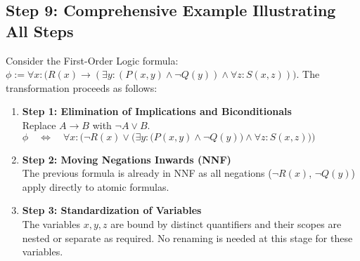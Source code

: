 \subsection{Step 9: Comprehensive Example Illustrating All Steps}
Consider the First-Order Logic formula:
$\phi := \forall x: \bigl(R(x) \rightarrow (\exists y: (P(x,y) \land \neg Q(y)) \land \forall z: S(x,z)))$.
The transformation proceeds as follows:
\begin{enumerate}
\item \textbf{Step 1: Elimination of Implications and Biconditionals} \\
      Replace $A \rightarrow B$ with $\neg A \lor B$. 
      \\[0.2cm]
      \hspace*{1.3cm}
      $\phi \quad\Leftrightarrow\quad \forall x: \bigl(\neg R(x) \lor \bigl(\exists y: (P(x,y) \land \neg
      Q(y)\bigr) \land \forall z: S(x,z)\bigr)\bigr)$ 
\item \textbf{Step 2: Moving Negations Inwards (NNF)} \\
      The previous formula is already in NNF as all negations ($\neg R(x)$, $\neg Q(y)$) apply directly to atomic formulas.

\item \textbf{Step 3: Standardization of Variables} \\
    The variables $x, y, z$ are bound by distinct quantifiers and their scopes are nested or separate as required. No renaming is needed at this stage for these variables.


\end{enumerate}

